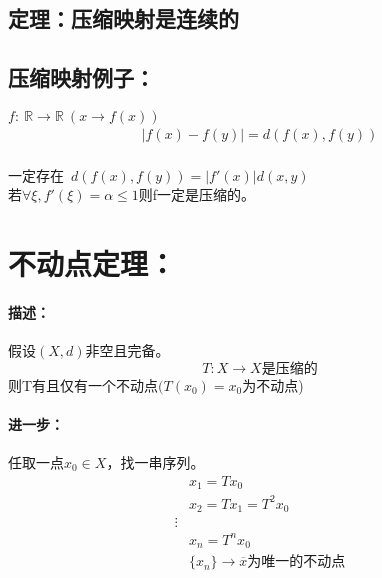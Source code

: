 \documentclass[11pt]{article}
\begin{document}
\begin{CJK*}{UTF8}{gbsn}
\subsection{定理：压缩映射是连续的}
\subsection{压缩映射例子：}
$f:~\mathbb{R}\rightarrow \mathbb{R}~(x\rightarrow f(x)) $
\begin{align*}
	|f(x)-f(y)|=d(f(x),f(y))
\end{align*}\\
一定存在~$d(f(x),f(y))=|f'(x)|d(x,y)$\\
若$\forall\xi, f'(\xi)=\alpha\leq 1$则f一定是压缩的。
\section{不动点定理：}
\large \paragraph{描述：}假设$(X,d)$非空且完备。\\
\begin{equation*}
	T:X\rightarrow X  \mbox{是压缩的}
\end{equation*}
则T有且仅有一个不动点$(T(x_0)=x_0$为不动点)
\paragraph{进一步：}任取一点$x_0\in X$，找一串序列。\\
\begin{align*}
	&x_1=Tx_0\\
	&x_2=Tx_1=T^2x_0\\
	\vdots\\
	&x_n=T^nx_0\\
	&\{x_n\}\rightarrow \overline{x}\mbox{为唯一的不动点}
\end{align*}

\end{CJK*}
\end{document}
